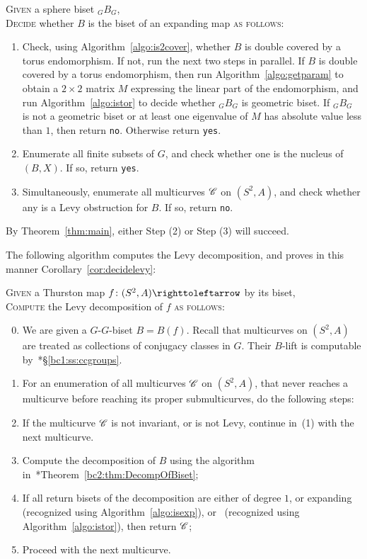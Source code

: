 \documentclass{amsart}
\begin{document}
\begin{algo}\label{algo:isexp}
  \textsc{Given} a sphere biset ${}_G B_G$,\\
  \textsc{Decide} whether $B$ is the biset of an expanding map
  \textsc{as follows:}\\\upshape
  \begin{enumerate}
  \item Check, using Algorithm~\ref{algo:is2cover}, whether $B$ is
    double covered by a torus endomorphism. If not, run the next two
    steps in parallel. If $B$ is double covered by a torus
    endomorphism, then run Algorithm~\ref{algo:getparam} to obtain a
    $2\times2$ matrix $M$ expressing the linear part of the
    endomorphism, and run Algorithm~\ref{algo:istor} to decide whether
    ${}_G B_G$ is geometric biset. If ${}_G B_G$ is not a geometric
    biset or at least one eigenvalue of $M$ has absolute value less
    than $1$, then return \texttt{no}. Otherwise return \texttt{yes}.
  \item Enumerate all finite subsets of $G$, and check whether one is
    the nucleus of $(B,X)$. If so, return \texttt{yes}.
  \item Simultaneously, enumerate all multicurves ${\mathscr C}$ on $(S^2,A)$,
    and check whether any is a Levy obstruction for $B$. If so, return
    \texttt{no}.
  \end{enumerate}
  By Theorem~\ref{thm:main}, either Step (2) or Step (3) will succeed.
\end{algo}

The following algorithm computes the Levy decomposition, and proves in
this manner Corollary~\ref{cor:decidelevy}:
\begin{algo}\label{algo:levy}
  \textsc{Given} a Thurston map $f\colon(S^2,A)\selfmap$ by its biset,\\
  \textsc{Compute} the Levy decomposition of $f$ \textsc{as follows:}\\\upshape
  \begin{enumerate}\setcounter{enumi}{-1}
  \item We are given a $G$-$G$-biset $B=B(f)$. Recall that multicurves
    on $(S^2,A)$ are treated as collections of conjugacy classes in
    $G$. Their $B$-lift is computable
    by~\cite{bartholdi-dudko:bc1}*{\S\ref{bc1:ss:ccgroups}}.
  \item For an enumeration of all multicurves ${\mathscr C}$ on $(S^2,A)$, that
    never reaches a multicurve before reaching its proper
    submulticurves, do the following steps:
  \item If the multicurve ${\mathscr C}$ is not invariant, or is not Levy,
    continue in~(1) with the next multicurve.
  \item Compute the decomposition of $B$ using the algorithm
    in~\cite{bartholdi-dudko:bc2}*{Theorem~\ref{bc2:thm:DecompOfBiset}};
  \item If all return bisets of the decomposition are either of degree
    $1$, or expanding (recognized using Algorithm~\ref{algo:isexp}),
    or \Tor\ (recognized using Algorithm~\ref{algo:istor}), then
    return ${\mathscr C}$;
  \item Proceed with the next multicurve.
  \end{enumerate}
\end{algo}
\end{document}
